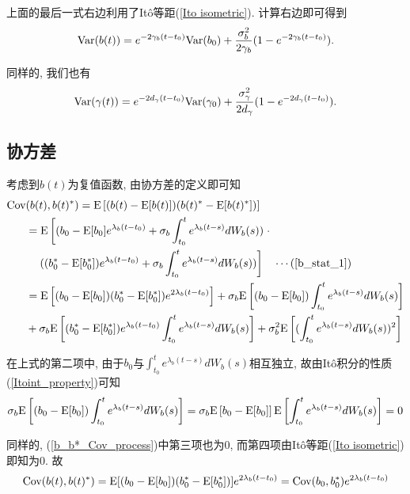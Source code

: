 \documentclass[notitlepage,cs4size,punct,oneside]{ctexrep}
\numberwithin{equation}{section}
\theoremstyle{mystyle}
\begin{document}
上面的最后一式右边利用了It\^{o}等距(\ref{Ito isometric}).
计算右边即可得到
\begin{equation} \label{b_stat_2} 
\text{Var}(b(t)) = e^{-2\gamma_b(t-t_0)}\text{Var}(b_0) + \frac{\sigma_b^2}{2\gamma_b}(1-e^{-2\gamma_b(t-t_0)}).
\end{equation}

同样的, 我们也有
\begin{equation} \label{gamma_stat_2}
\text{Var}(\gamma(t)) = e^{-2d_\gamma(t-t_0)}\text{Var}(\gamma_0) + \frac{\sigma_\gamma^2}{2d_\gamma}(1-e^{-2d_\gamma(t-t_0)}).
\end{equation}

\subsection{协方差}
考虑到$b(t)$为复值函数, 由协方差的定义\cite{shuyuanhe2006probability}即可知
\begin{equation} \label{b_b*_Cov_process}
\begin{split}
\text{Cov}&(b(t), b(t)^*) = \text{E}\left[(b(t) - \text{E}[b(t)])(b(t)^* - \text{E}[b(t)^*])\right] \\
&= \text{E}\left[(b_0 - \text{E}[b_0]e^{\lambda_b (t-t_0)}+\sigma_b\int_{t_0}^{t} e^{\lambda_b (t-s)}dW_b(s))\right. \cdot \\
&\quad \left.((b_0^* - \text{E}[b_0^*])e^{\lambda_b(t-t_0)}+\sigma_b\int_{t_0}^t e^{\lambda_b (t-s)}dW_b(s))\right] \quad\cdots(\ref{b_stat_1}) \\
&= \text{E}\left[(b_0 - \text{E}[b_0])(b_0^* - \text{E}[b_0^*])e^{2\lambda_b (t-t_0)}\right] + \sigma_b\text{E}\left[(b_0 - \text{E}[b_0])\int_{t_0}^{t}e^{\lambda_b(t-s)}dW_b(s)\right]\\
&+ \sigma_b\text{E}\left[(b_0^*-\text{E}[b_0^*])e^{\lambda_b(t-t_0)}\int_{t_0}^{t}e^{\lambda_b(t-s)}dW_b(s)\right] + \sigma_b^2\text{E}\left[(\int_{t_0}^{t}e^{\lambda_b(t-s)}dW_b(s))^2\right]
\end{split}
\end{equation}

在上式的第二项中, 由于$b_0$与$\int_{t_0}^{t} e^{\lambda_b (t-s)}dW_b(s)$相互独立, 故由It\^{o}积分的性质(\ref{Itoint_property})可知
\begin{equation}
\sigma_b\text{E}\left[(b_0 - \text{E}[b_0])\int_{t_0}^{t}e^{\lambda_b(t-s)}dW_b(s)\right] = \sigma_b\text{E}\left[b_0 - \text{E}[b_0]\right]\text{E}\left[\int_{t_0}^{t}e^{\lambda_b(t-s)}dW_b(s)\right] = 0
\end{equation}

同样的, (\ref{b_b*_Cov_process})中第三项也为0, 而第四项由It\^{o}等距(\ref{Ito isometric})即知为0. 故
\begin{equation} \label{b_b*_Cov}
\text{Cov}(b(t), b(t)^*) = \text{E}[(b_0-\text{E}[b_0])(b_0^*-\text{E}[b_0^*])]e^{2\lambda_b(t-t_0)} = \text{Cov}(b_0, b_0^*)e^{2\lambda_b(t-t_0)}
\end{equation}
\end{document}

